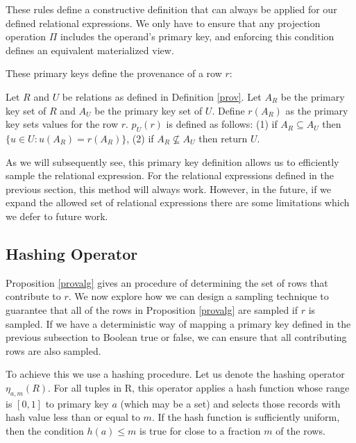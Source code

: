 These rules define a constructive definition that can always be applied for our defined relational expressions. 
We only have to ensure that any projection operation $\Pi$ includes the operand's primary key, and enforcing this condition
defines an equivalent materialized view.

These primary keys define the provenance of a row $r$:
\begin{proposition}\label{provalg}
Let $R$ and $U$ be relations as defined in Definition \ref{prov}. 
Let $A_R$ be the primary key set of $R$ and $A_U$ be the primary key 
set of $U$.
Define $r(A_R)$ as the primary key sets values for the row $r$.
$p_U(r)$ is defined as follows: (1) if $A_R \subseteq A_U$ then 
$\{u \in U: u(A_R) = r(A_R)\}$, (2) if $A_R \not \subseteq A_U$ then
return $U$.
\end{proposition}

As we will subsequently see, this primary key definition allows us to efficiently sample the relational expression.
For the relational expressions defined in the previous section, this method will always work.
However, in the future, if we expand the allowed set of relational expressions there are some limitations which we defer to future work.


\subsection{Hashing Operator}
\label{push}
Proposition \ref{provalg} gives an procedure of determining the set of rows that contribute to $r$. 
We now explore how we can design a sampling technique to guarantee that all of the rows in Proposition \ref{provalg} are sampled if $r$ is sampled.
If we have a deterministic way of mapping a primary key defined in the previous subsection to Boolean true or false, we can ensure that all contributing rows are also sampled. 

To achieve this we use a hashing procedure.
Let us denote the hashing operator $\eta_{a, m}(R)$. 
For all tuples in R, this operator applies a hash function whose range is $[0,1]$ to primary key $a$ (which may be a set) and selects those records with hash value less than or equal to $m$.
If the hash function is sufficiently uniform, then the condition $h(a) \le m$ is true for close to a fraction $m$ of the rows. 

